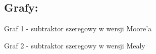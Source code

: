 \documentclass[12pt,a4paper]{article}
\begin{document}
		\subsection{Grafy:}
	
			\begin{center}
				Graf 1 - subtraktor szeregowy w wersji Moore'a
			\end{center}
			
			
			\begin{center}
				Graf 2 - subtraktor szeregowy w wersji Mealy
			\end{center}
		
		\FloatBarrier
		\restoregeometry
		
\end{document}

